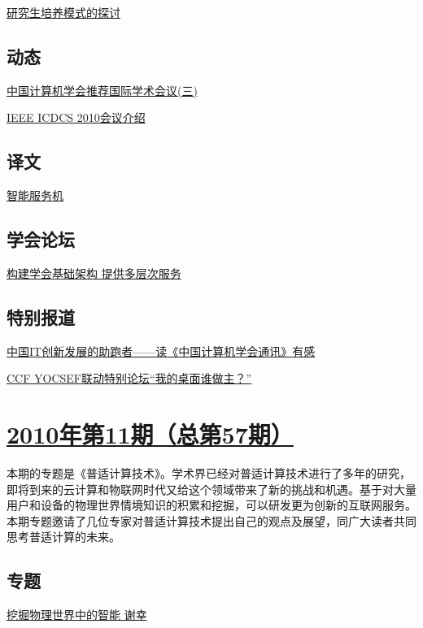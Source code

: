 \documentclass[a4paper]{article}
\begin{document}
\href{http://history.ccf.org.cn/resources/1190201776262/2010/12/23/11.pdf}{研究生培养模式的探讨}

\subsection{动态}
\href{http://history.ccf.org.cn/resources/1190201776262/2010/12/23/15.pdf}{中国计算机学会推荐国际学术会议(三)}

\href{http://history.ccf.org.cn/resources/1190201776262/2010/12/23/14.pdf}{IEEE ICDCS 2010会议介绍}

\subsection{译文}
\href{http://history.ccf.org.cn/resources/1190201776262/2010/12/23/16.pdf}{智能服务机}

\subsection{学会论坛}
\href{http://history.ccf.org.cn/resources/1190201776262/2010/12/23/19.pdf}{构建学会基础架构 提供多层次服务}

\subsection{特别报道}
\href{http://history.ccf.org.cn/resources/1190201776262/2010/12/23/17.pdf}{中国IT创新发展的助跑者——读《中国计算机学会通讯》有感}

\href{http://history.ccf.org.cn/resources/1190201776262/2010/12/23/18.pdf}{CCF YOCSEF联动特别论坛“我的桌面谁做主？”}


\section{\href{http://history.ccf.org.cn/sites/ccf/jsjtbbd.jsp?contentId=2578397185803}{\textbf{2010年第11期（总第57期）}}}
本期的专题是《普适计算技术》。学术界已经对普适计算技术进行了多年的研究，即将到来的云计算和物联网时代又给这个领域带来了新的挑战和机遇。基于对大量用户和设备的物理世界情境知识的积累和挖掘，可以研发更为创新的互联网服务。本期专题邀请了几位专家对普适计算技术提出自己的观点及展望，同广大读者共同思考普适计算的未来。
\subsection{专题}
\href{http://history.ccf.org.cn/resources/1190201776262/2010/11/17/9.pdf}{挖掘物理世界中的智能  谢幸}
\end{document}
